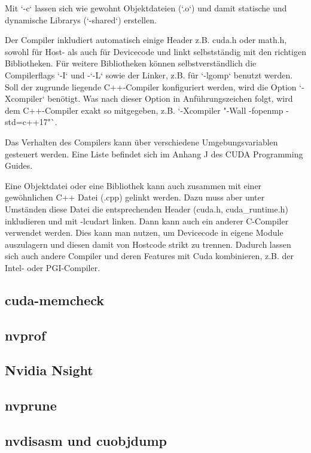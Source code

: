 			Mit \li`-c` lassen sich wie gewohnt Objektdateien (\li`.o`) und damit statische und dynamische Librarys (\li`-shared`) erstellen.
		
			Der Compiler inkludiert automatisch einige Header z.B. cuda.h oder math.h, sowohl für Host- als auch für Devicecode und linkt selbstständig mit den richtigen Bibliotheken. Für weitere Bibliotheken können selbstverständlich die Compilerflags \li`-I` und -\li`-L` sowie der Linker, z.B. für \li`-lgomp` benutzt werden.
			Soll der zugrunde liegende C++-Compiler konfiguriert werden, wird die Option \li`-Xcompiler` benötigt. Was nach dieser Option in Anführungszeichen folgt, wird dem C++-Compiler exakt so mitgegeben, z.B. \li`-Xcompiler "-Wall -fopenmp -std=c++17"`.
		
			Das Verhalten des Compilers kann über verschiedene Umgebungsvariablen gesteuert werden. Eine Liste befindet sich im Anhang J des CUDA Programming Guides. \autocite{cudaPG} 
		
			Eine Objektdatei oder eine Bibliothek kann auch zusammen mit einer gewöhnlichen C++ Datei (.cpp) gelinkt werden. Dazu muss aber unter Umständen diese Datei die entsprechenden Header (cuda.h, cuda{\_}runtime.h) inkludieren und mit -lcudart linken. Dann kann auch ein anderer C-Compiler verwendet werden. Dies kann man nutzen, um Devicecode in eigene Module auszulagern und diesen damit von Hostcode strikt zu trennen. Dadurch lassen sich auch andere Compiler und deren Features mit Cuda kombinieren, z.B. der Intel- oder PGI-Compiler.
			\subsection{cuda-memcheck}
			\subsection{nvprof}
			\subsection{Nvidia Nsight}
			\subsection{nvprune}
			\subsection{nvdisasm und cuobjdump}
		
